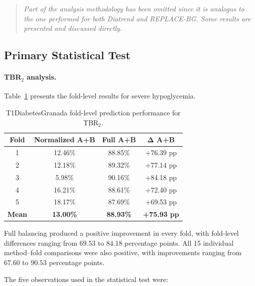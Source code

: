 \begin{quote}
\small
\textit{Part of the analysis methodology has been omitted since it is analogus to the one performed for both Diatrend and REPLACE-BG. Some results are presented and discussed directly}.
\end{quote}

\subsection{Primary Statistical Test}
\label{subsec:t1diabetesgranadaprimary_analysis}

\paragraph{TBR$_2$ analysis.}

Table~\ref{tab:t1diabetesgranada_fold_tbr2_effect} presents the fold-level results for severe hypoglycemia.

\begin{table}[htbp]
    \centering
    \caption{T1DiabetesGranada fold-level prediction performance for TBR$_2$.}
    \label{tab:t1diabetesgranada_fold_tbr2_effect}
    \begin{tabular}{cccc}
        \toprule
        \textbf{Fold}
        & \textbf{Normalized A+B}
        & \textbf{Full A+B}
        & \(\boldsymbol{\Delta}\) \textbf{A+B} \\
        \midrule
        1 & 12.46\% & 88.85\% & +76.39 pp \\
        2 & 12.18\% & 89.32\% & +77.14 pp \\
        3 & 5.98\%  & 90.16\% & +84.18 pp \\
        4 & 16.21\% & 88.61\% & +72.40 pp \\
        5 & 18.17\% & 87.69\% & +69.53 pp \\
        \midrule
        \textbf{Mean}
        & \textbf{13.00\%}
        & \textbf{88.93\%}
        & \textbf{+75.93 pp} \\
        \bottomrule
    \end{tabular}
\end{table}

Full balancing produced a positive improvement in every fold, with fold-level differences ranging from \(69.53\) to \(84.18\) percentage points. All 15 individual method--fold comparisons were also positive, with improvements ranging from \(67.60\) to \(90.53\) percentage points.

The five observations used in the statistical test were:

